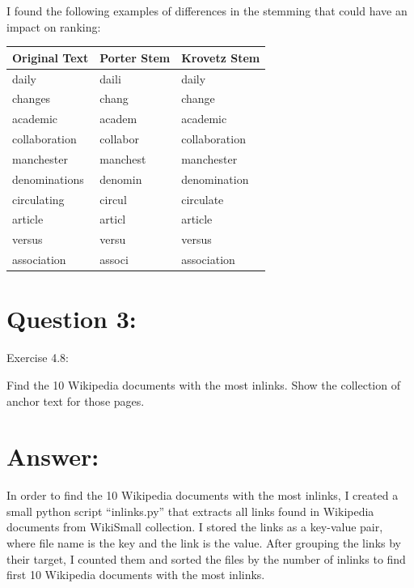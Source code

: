 \documentclass[a4paper, 11pt]{article}
\begin{document}
\pagebreak

I found the following examples of differences in the stemming that could have an impact on ranking:

\begin{longtable}{ |p{3cm}|p{3cm}|p{3cm}| } 
\hline
Original Text & Porter Stem & Krovetz Stem \\
 \hline 
 daily & daili & daily \\
 \hline
  changes & chang & change \\
 \hline
  academic & academ & academic \\
 \hline
  collaboration & collabor & collaboration \\
 \hline
  manchester & manchest & manchester \\
 \hline
  denominations & denomin & denomination \\
 \hline
  circulating & circul & circulate \\
 \hline
  article & articl & article \\
 \hline
  versus & versu & versus \\
 \hline
  association & associ & association \\
 \hline
\end{longtable}



\section*{Question 3:}
Exercise 4.8:

Find the 10 Wikipedia documents with the most inlinks. Show the collection of anchor text for those pages.

\section*{Answer:}

In order to find the 10 Wikipedia documents with the most inlinks, I created a small python script ``inlinks.py'' that extracts all links found in Wikipedia documents from WikiSmall collection. I stored the links as a key-value pair, where file name is the key and the link is the value. After grouping the links by their target, I counted them and sorted the files by the number of inlinks to find first 10  Wikipedia documents with the most inlinks.


\end{document}
